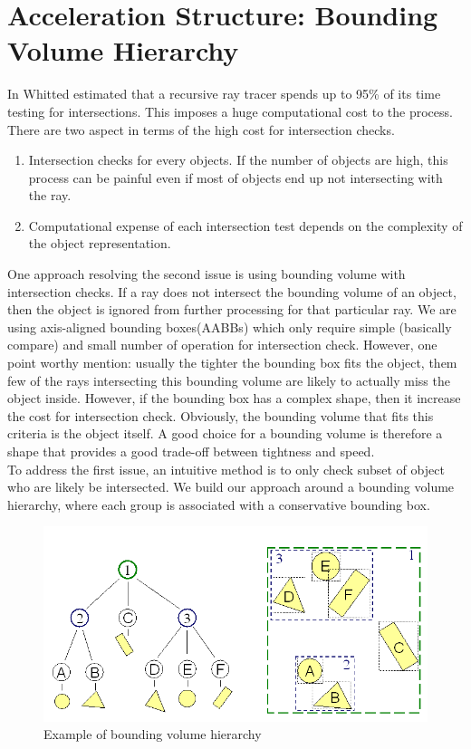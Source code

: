 \documentclass[a4paper,10pt]{article}
\begin{document}
   
\section{Acceleration Structure: Bounding Volume Hierarchy}
In \cite{whitted2005improved} Whitted estimated that a recursive ray tracer spends up to 95\% of its time testing for intersections. This imposes a huge computational cost to the process. There are two aspect in terms of the high cost for intersection checks. 
\begin{enumerate}
    \item Intersection checks for every objects. If the number of objects are high, this process can be painful even if most of objects end up not intersecting with the ray.
    \item Computational expense of each intersection test depends on the complexity of the object representation. 
\end{enumerate}
One approach resolving the second issue is using bounding volume with intersection checks. If a ray does not intersect the bounding volume of an object, then the object is ignored from further processing for that particular ray. We are using axis-aligned bounding boxes(AABBs) which only require simple (basically compare) and small number of operation for intersection check. However, one point worthy mention: usually the tighter the bounding box fits the object, them few of the rays intersecting this bounding volume are likely to actually miss the object inside. However, if the bounding box has a complex shape, then it increase the cost for intersection check. Obviously, the bounding volume that fits this criteria is the object itself. A good choice for a bounding volume is therefore a shape that provides a good trade-off between tightness and speed. \\
To address the first issue, an intuitive method is to only check subset of object who are likely be intersected. We build our approach around a bounding volume hierarchy, where each group is associated with a conservative bounding box. 
\begin{figure}[H]
    \centering
    \includegraphics[scale=0.3]{bvh.png}
    \caption{Example of bounding volume hierarchy}
    \label{fig:bvh}
\end{figure}
\end{document}
